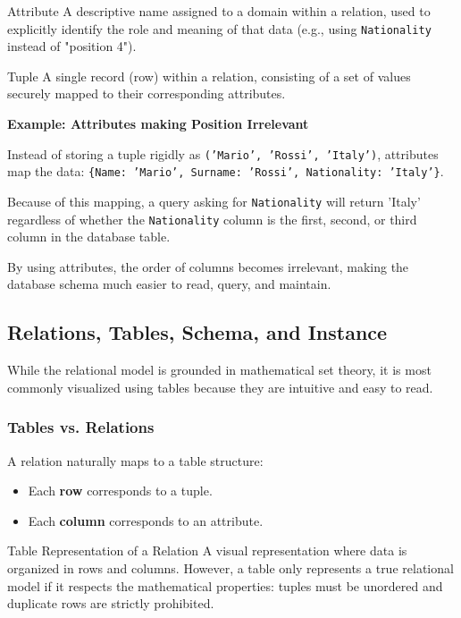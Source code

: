 \begin{defbox}{Attribute}
A descriptive name assigned to a domain within a relation, used to explicitly identify the role and meaning of that data (e.g., using \texttt{Nationality} instead of "position 4").
\end{defbox}

\begin{defbox}{Tuple}
A single record (row) within a relation, consisting of a set of values securely mapped to their corresponding attributes.
\end{defbox}

\vspace{0.2cm}
\begin{example}{\textbf{Example: Attributes making Position Irrelevant}}

Instead of storing a tuple rigidly as \texttt{('Mario', 'Rossi', 'Italy')}, attributes map the data: \texttt{\{Name: 'Mario', Surname: 'Rossi', Nationality: 'Italy'\}}. 

Because of this mapping, a query asking for \texttt{Nationality} will return 'Italy' regardless of whether the \texttt{Nationality} column is the first, second, or third column in the database table.
\end{example}

By using attributes, the order of columns becomes irrelevant, making the database schema much easier to read, query, and maintain.

\subsection{Relations, Tables, Schema, and Instance}
While the relational model is grounded in mathematical set theory, it is most commonly visualized using tables because they are intuitive and easy to read.

\subsubsection{Tables vs. Relations}
A relation naturally maps to a table structure:
\begin{itemize}
    \item Each \textbf{row} corresponds to a tuple.
    \item Each \textbf{column} corresponds to an attribute.
\end{itemize}

\begin{defbox}{Table Representation of a Relation}
A visual representation where data is organized in rows and columns. However, a table only represents a true relational model if it respects the mathematical properties: tuples must be unordered and duplicate rows are strictly prohibited.
\end{defbox}

